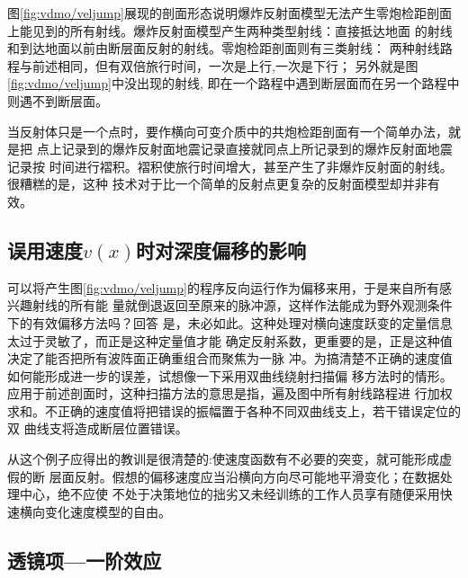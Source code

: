 图\ref{fig:vdmo/veljump}展现的剖面形态说明爆炸反射面模型无法产生零炮检距剖面
上能见到的所有射线。爆炸反射面模型产生两种类型射线：直接抵达地面
的射线和到达地面以前由断层面反射的射线。零炮检距剖面则有三类射线：
两种射线路程与前述相同，但有双倍旅行时间，一次是上行,一次是下行；
另外就是图\ref{fig:vdmo/veljump}中没出现的射线,
即在一个路程中遇到断层面而在另一个路程中则遇不到断层面。

当反射体只是一个点时，要作横向可变介质中的共炮检距剖面有一个简单办法，就是把
点上记录到的爆炸反射面地震记录直接就同点上所记录到的爆炸反射面地震记录按
时间进行褶积。褶积使旅行时间增大，甚至产生了非爆炸反射面的射线。很糟糕的是，这种
技术对于比一个简单的反射点更复杂的反射面模型却并非有效。

\subsection{误用速度$v(x)$时对深度偏移的影响}
\label{sec:3.7.6}

可以将产生图\ref{fig:vdmo/veljump}的程序反向运行作为偏移来用，于是来自所有感兴趣射线的所有能
量就倒退返回至原来的脉冲源，这样作法能成为野外观测条件下的有效偏移方法吗？回答
是，未必如此。这种处理对横向速度跃变的定量信息太过于灵敏了，而正是这种定量值才能
确定反射系数，更重要的是，正是这种值决定了能否把所有波阵面正确重组合而聚焦为一脉
冲。为搞清楚不正确的速度值如何能形成进一步的误差，试想像一下采用双曲线绕射扫描偏
移方法时的情形。应用于前述剖面时，这种扫描方法的意思是指，遍及图中所有射线路程进
行加权求和。不正确的速度值将把错误的振幅置于各种不同双曲线支上，若干错误定位的双
曲线支将造成断层位置错误。

从这个例子应得出的教训是很清楚的:使速度函数有不必要的突变，就可能形成虚假的断
层面反射。假想的偏移速度应当沿横向方向尽可能地平滑变化；在数据处理中心，绝不应使
不处于决策地位的拙劣又未经训练的工作人员享有随便采用快速横向变化速度模型的自由。

\subsection{透镜项---一阶效应}
\label{sec:3.7.7}

